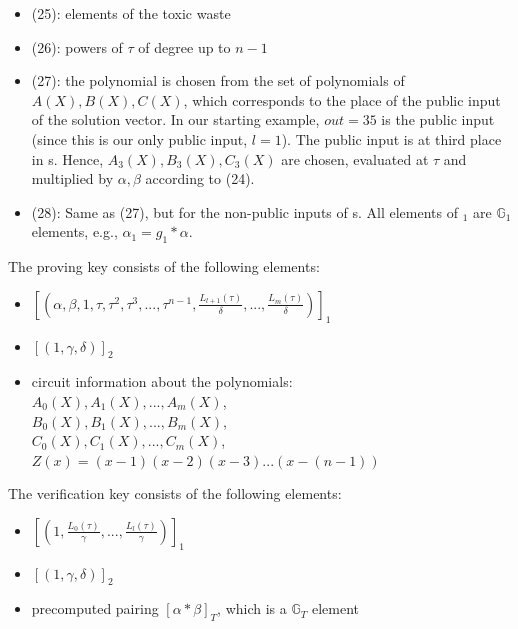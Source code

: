 \begin{itemize}
    \item (25): elements of the toxic waste
    \item (26): powers of \begin{math}\tau\end{math} of degree up to \(n-1\)
    \item (27): the polynomial is chosen from the set of polynomials of \(A(X), B(X), C(X)\), which corresponds to the place of the public input of the solution vector. In our starting example, \(out = 35\) is the public input (since this is our only public input, \(l=1\)). The public input is at third place in s. Hence, \(A_3(X), B_3(X), C_3(X)\) are chosen, evaluated at \begin{math}\tau\end{math} and multiplied by \begin{math} \alpha, \beta\end{math} according to (24).
    \item (28): Same as (27), but for the non-public inputs of s. All elements of \begin{math} [\sigma_1]_1 \end{math} are \begin{math}\mathbb{G}_1\end{math} elements, e.g., \begin{math}\alpha_1 = g_1 * \alpha\end{math}.
\end{itemize}

The proving key consists of the following elements:
\begin{itemize}
    \item \([(\alpha, \beta, 1, \tau, \tau^2, \tau^3, ..., \tau^{n-1}, \frac{L_{l+1}(\tau)}{\delta}, ..., \frac{L_m(\tau)}{\delta})]_1\)
    \item \([(1, \gamma, \delta)]_2\)
    \item circuit information about the polynomials:\\
    \(A_0(X), A_1(X), ..., A_m(X)\),\\
    \(B_0(X), B_1(X), ..., B_m(X)\),\\
    \(C_0(X), C_1(X), ..., C_m(X)\),\\
    \(Z(x) = (x-1)(x-2)(x-3)...(x-(n-1))\)\\
\end{itemize}

The verification key consists of the following elements:
\begin{itemize}
    \item \([(1, \frac{L_0(\tau)}{\gamma}, ..., \frac{L_l(\tau)}{\gamma})]_1\)
    \item \([(1, \gamma, \delta)]_2\)
    \item precomputed pairing \([\alpha * \beta]_T\), which is a \begin{math}\mathbb{G}_T\end{math} element
\end{itemize}

